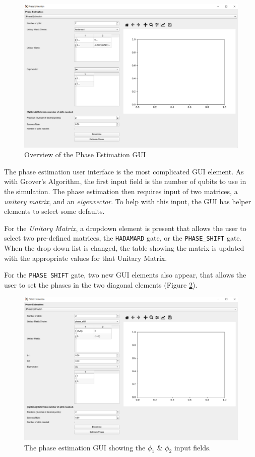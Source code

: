 \documentclass{article}
\begin{document}
\begin{figure}[H]
\includegraphics[width=15cm]{docs/images/gui_overview_phase_estimation.png}
\caption{\label{gui-overview-phase} Overview of the Phase Estimation GUI}
\end{figure}

The phase estimation user interface is the most complicated GUI element.
As with Grover's Algorithm, the first input field is the number of qubits to use in the simulation.
The phase estimation then requires input of two matrices, a \textit{unitary matrix}, and an \textit{eigenvector}.
To help with this input, the GUI has helper elements to select some defaults.

\medskip

For the \textit{Unitary Matrix}, a dropdown element is present that allows the user to select two pre-defined
matrices, the \verb#HADAMARD# gate, or the \verb#PHASE_SHIFT# gate.
When the drop down list is changed, the table showing the matrix is updated with the appropriate values for that Unitary Matrix.

\medskip

For the \verb#PHASE SHIFT# gate, two new GUI elements also appear, that allows the user to set the
phases in the two diagonal elements (Figure \ref{fig:gui-overview-phase-2}).

\begin{figure}[H]
\includegraphics[width=15cm]{docs/images/gui_overview_phase_estimation_2.png}
\caption{\label{fig:gui-overview-phase-2} The phase estimation GUI showing the $\phi_1$ \& $\phi_2$ input fields.}
\end{figure}
\end{document}
